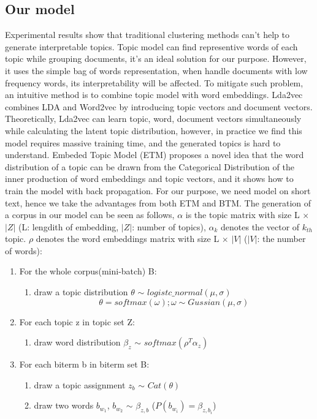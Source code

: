 \subsection{Our model}
\label{sec:modeling}
Experimental results show that traditional clustering methods can't help to generate interpretable topics.
Topic model can find representive words of each topic while grouping documents, it's an ideal solution for our purpose. However, it uses the simple bag of words representation, when handle documents with low frequency words, its interpretability will be affected. To mitigate such problem, an intuitive method is to combine topic model with word embeddings. Lda2vec \cite{moody2016mixing} combines LDA and Word2vec by introducing topic vectors and document vectors. Theoretically, Lda2vec can learn topic, word, document vectors simultaneously while calculating the latent topic distribution, however, in practice we find this model requires massive training time, and the generated topics is hard to understand. Embeded Topic Model (ETM) \cite{dieng2019topic} proposes a novel idea that the word distribution of a topic can be drawn from the Categorical Distribution of the inner production of word embeddings and topic vectors, and it shows how to train the model with back propagation. For our purpose, we need model on short text, hence we take the advantages from both ETM and BTM. The generation of a corpus in our model can be seen as follows, $\alpha$ is the topic matrix with size L $\times$ $|Z|$ (L: lengdith of embedding, $|Z|$: number of topics), $\alpha_k$ denotes the vector of $k_{th}$ topic. $\rho$ denotes the word embeddings matrix with size L $\times$ $|V|$ ($|V|$: the number of words):
\begin{enumerate}
    \item For the whole corpus(mini-batch) B:
    \begin{enumerate}
        \item draw a topic distribution $\theta$ $\sim$ $logistc\_normal(\mu, \sigma)$
        \begin{equation}
            \theta=softmax(\omega); \omega \sim Gussian(\mu, \sigma)
            \label{eq:lognormal}
        \end{equation}
    \end{enumerate} 
    \item For each topic z in topic set Z:
    \begin{enumerate}
        \item draw word distribution $\beta_z$ $\sim$ $softmax(\rho^T\alpha_z)$
    \end{enumerate}
    \item For each biterm b in biterm set B:
    \begin{enumerate}
        \item draw a topic assignment $z_b$ $\sim$ $Cat(\theta)$
        \item draw two words $b_{w_1}$, $b_{w_2}$ $\sim$ $\beta_{z,b}$ ($P(b_{w_i}) = \beta_{z,{b_i}}$)
    \end{enumerate}
\end{enumerate} 
